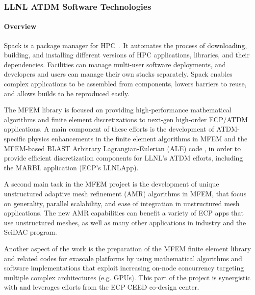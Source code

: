 \subsubsection{ LLNL ATDM Software Technologies}

\paragraph{Overview} %

Spack is a package manager for
HPC~\cite{stewart+:sc19-spack-bof,gamblin+:sc19-spack-tutorial,gamblin+:lanl-spack-tutorial-2019,gamblin+:doe-nsf-spack-tutorial,baber+:pearc19-spack-tutorial,gamblin+:isc19-spack-tutorial,gamblin+:ecp19-spack-roundtable,gamblin+:ecp19-spack-tutorial,gamblin+:sc18-spack-bof,gamblin+:sc18-spack-tutorial,gamblin+:ecp18-spack-sotu,gamblin+:ecp18-spack-tutorial,gamblin+:sc17-spack-tutorial,gamblin:hpckp17,gamblin+:llnl-spack-tutorial-17,gamblin+:sc16-spack-tutorial}.
It automates the process of downloading, building, and installing
different versions of HPC applications, libraries, and their
dependencies.  Facilities can manage multi-user software deployments, and
developers and users can manage their own stacks separately.  Spack
enables complex applications to be assembled from components, lowers
barriers to reuse, and allows builds to be reproduced easily.

The MFEM library
\cite{MFEM,mfem_paper_2020} is focused on providing high-performance mathematical algorithms
and finite element discretizations to next-gen high-order ECP/ATDM
applications. A main component of these efforts is the development of
ATDM-specific physics enhancements in the finite element algorithms in
MFEM and the MFEM-based BLAST Arbitrary Lagrangian-Eulerian (ALE)
code \cite{BLAST}, in order to provide efficient discretization
components for LLNL's ATDM efforts, including the MARBL application
(ECP's LLNLApp).

A second main task in the MFEM project is the development of unique unstructured
adaptive mesh refinement (AMR) algorithms in MFEM, that focus on generality,
parallel scalability, and ease of integration in unstructured mesh
applications. The new AMR capabilities can benefit a variety of ECP apps that
use unstructured meshes, as well as many other applications in industry and the
SciDAC program.

Another aspect of the work is the preparation of the MFEM finite element library
and related codes for exascale platforms by using mathematical algorithms and
software implementations that exploit increasing on-node concurrency targeting
multiple complex architectures (e.g. GPUs). This part of the project is
synergistic with and leverages efforts from the ECP CEED co-design center.

